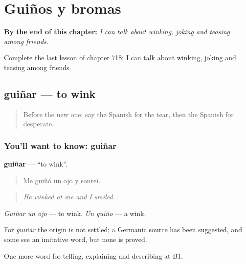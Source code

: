 
\chapter{Guiños y bromas}
\label{ch:es-guinos-y-bromas}

\begin{chapteropening}
\textbf{By the end of this chapter:} \emph{I can talk about winking, joking and teasing among friends.}

Complete the last lesson of chapter 718: I can talk about winking, joking and teasing among friends.
\end{chapteropening}

\section[guiñar]{guiñar — to wink}

\label{lesson:ES-C718-guinar}



\begin{quote}
Before the new one: say the Spanish for the tear, then the Spanish for desperate.
\end{quote}

\subsection*{You'll want to know: guiñar}
\textbf{guiñar} — \textquotedblleft{}to wink\textquotedblright{}.

\begin{quote}
Me guiñó un ojo y sonreí.
\end{quote}

\begin{quote}
\emph{He winked at me and I smiled.}
\end{quote}

\emph{Guiñar un ojo} — to wink. \emph{Un guiño} — a wink.

\begin{cousinweb}
For \emph{guiñar} the origin is not settled; a Germanic source has been suggested, and some see an imitative word, but none is proved.
\end{cousinweb}

\begin{grammarlens}[title={What you've built}]
One more word for telling, explaining and describing at B1.
\end{grammarlens}

